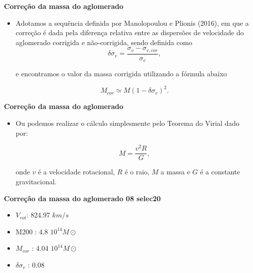 \documentclass[xcolor=dvipsnames,10pt]{beamer}
\begin{document}
\begin{frame}
  \begin{block}{{\textbf{Correção da massa do aglomerado}}}
    \begin{itemize}
      \item  Adotamos a sequência definida por Manolopoulou e Plionis (2016), em que a correção é dada pela diferença relativa entre as dispersões de velocidade do aglomerado corrigida e não-corrigida, sendo definida como
      \begin{equation}
        \delta \sigma_{v} = \frac{\sigma_{v} - \sigma_{v,cor}}{\sigma_{v}},
        \label{eq:corrveldisp}
        \end{equation}

        \noindent e encontramos o valor da massa corrigida utilizando a fórmula abaixo

        \begin{equation}
        M_{cor} \simeq M (1 - \delta \sigma_{v})^2.
        \label{eq:corrmass}
        \end{equation}
    \end{itemize}
  \end{block}
\end{frame}

\begin{frame}
  \begin{block}{{\textbf{Correção da massa do aglomerado}}}
    \begin{itemize}
      \item  Ou podemos realizar o cálculo simplesmente pelo Teorema do Virial dado por:

        \begin{equation}
        M = \frac{v^2 R}{G},
        \label{eq:massa}
        \end{equation}

        \noindent onde $v$ é a velocidade rotacional, $R$ é o raio, $M$ a massa e $G$ é a constante gravitacional.
    \end{itemize}
  \end{block}
\end{frame}

\begin{frame}
  \begin{block}{{\textbf{Correção da massa do aglomerado 08 selec20}}}
    \begin{itemize}
        \item \textbf{$V_{rot}$}: 824.97 $km/s$
        \item M200 : 4.8 $10^{14}  M\odot$ 
        \item \textbf{$M_{cor}$} : 4.04 $10^{14}  M\odot$ 
        \item $\delta \sigma_{v}$ : 0.08
    \end{itemize}
  \end{block}
\end{frame}
\end{document}
